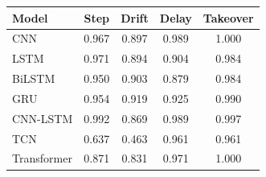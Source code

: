 \begin{tabular}{lcccc}
\toprule
Model & Step & Drift & Delay & Takeover \\
\midrule
CNN & 0.967 & 0.897 & 0.989 & 1.000 \\
LSTM & 0.971 & 0.894 & 0.904 & 0.984 \\
BiLSTM & 0.950 & 0.903 & 0.879 & 0.984 \\
GRU & 0.954 & 0.919 & 0.925 & 0.990 \\
CNN-LSTM & 0.992 & 0.869 & 0.989 & 0.997 \\
TCN & 0.637 & 0.463 & 0.961 & 0.961 \\
Transformer & 0.871 & 0.831 & 0.971 & 1.000 \\
\bottomrule
\end{tabular}
